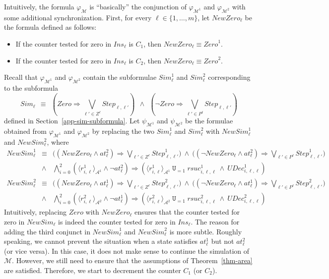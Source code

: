 \documentclass[a4paper,UKenglish,cleveref, autoref, thm-restate]{lipics-v2021}
\newcommand{\A}{\mathcal{A}}
\newcommand{\M}{\mathcal{M}}
\newcommand{\ex}[1]{\langle #1 \rangle}
\newcommand{\Simulate}{\mathit{Sim}}
\newcommand{\NewSimulate}{\mathit{NewSim}}
\newcommand{\Step}{\mathit{Step}}
\newcommand{\Zero}{\mathit{Zero}}
\newcommand{\NewZero}{\textit{NewZero}}
\newcommand{\Ins}{\mathit{Ins}}
\newcommand{\at}{\mathit{at}}
\newcommand{\rSuc}{\textit{rsuc}}
\newcommand{\UDec}{\textit{UDec}}
\newcommand*{\opu}{\operatorname{\pmb{\mathtt{U}}}}
\begin{document}
Intuitively, the formula $\varphi_\M$ is ``basically'' the conjunction of $\varphi_{\M^1}$ and $\varphi_{\M^2}$ with some additional synchronization. First, for every $\ell \in \{1,\ldots,m\}$, let $\NewZero_\ell$ be the formula defined as follows:
\begin{itemize}
    \item If the counter tested for zero in $\Ins_\ell$ is $C_1$, then $\NewZero_\ell \equiv \Zero^1$.
    \item If the counter tested for zero in $\Ins_\ell$ is $C_2$, then $\NewZero_\ell \equiv \Zero^2$.
\end{itemize}  
Recall that $\varphi_{\M^1}$ and $\varphi_{\M^2}$ contain the subformulae 
$\Simulate_\ell^1$ and $\Simulate_\ell^2$ corresponding to the subformula
\begin{equation*}\textstyle
    \Simulate_\ell ~~\equiv~~ (\Zero \Rightarrow \bigvee_{\ell' \in Z^\ell} \Step_{\ell,\ell'}) ~~\wedge~~
    (\neg\Zero \Rightarrow \bigvee_{\ell' \in P^\ell} \Step_{\ell,\ell'}) 
\end{equation*} 
defined in Section~\ref{app-sim-subformula}. Let $\psi_{\M^1}$ and $\psi_{\M^2}$ be the formulae obtained from $\varphi_{\M^1}$ and $\varphi_{\M^2}$ by replacing the 
two $\Simulate_\ell^1$ and $\Simulate_\ell^2$ with $\NewSimulate_\ell^1$ and $\NewSimulate_\ell^2$, where
{\small \begin{eqnarray*}
    \NewSimulate_\ell^1 & \equiv & \textstyle\big((\NewZero_\ell \wedge \at_{\ell}^2) \Rightarrow
       \bigvee_{\ell' \in Z^\ell} \Step^1_{\ell,\ell'}\big) ~\wedge~
    \big((\neg\NewZero_\ell \wedge \at_{\ell}^2) \Rightarrow \bigvee_{\ell' \in P^\ell} \Step^1_{\ell,\ell'}\big)\\
     & \wedge & 
    \bigwedge_{i=0}^2 \left(\ex{r_{i,\ell}^1}_{\A^1} \wedge \neg\at_\ell^2\right) \Rightarrow  \left( \ex{r_{i,\ell}^1}_{\A^1} \opu_{=1} \rSuc^1_{i,\ell,\ell} 
    \ \wedge\ \UDec^1_{i,\ell,\ell} \right)\\  
    \NewSimulate_\ell^2 & \equiv & \textstyle\big((\NewZero_\ell \wedge \at_{\ell}^1) \Rightarrow \bigvee_{\ell' \in Z^\ell} \Step^2_{\ell,\ell'}\big) 
    ~\wedge~
    \big((\neg\NewZero_\ell \wedge \at_{\ell}^1) \Rightarrow \bigvee_{\ell' \in P^\ell} \Step^2_{\ell,\ell'}\big)\\
  & \wedge & \bigwedge_{i=0}^2 \left(\ex{r_{i,\ell}^2}_{\A^2} \wedge \neg\at_\ell^1\right) \Rightarrow  \left( \ex{r_{i,\ell}^2}_{\A^2} \opu_{=1} \rSuc^2_{i,\ell,\ell} \ \wedge\ \UDec^2_{i,\ell,\ell} \right) 
\end{eqnarray*}}Intuitively, replacing $\Zero$ with $\NewZero_\ell$ ensures that the counter tested for zero in $\NewSimulate_\ell$ is indeed the counter tested for zero in $\Ins_\ell$.
The reason for adding the third conjunct in $\NewSimulate_\ell^1$ and $\NewSimulate_\ell^2$ is more subtle. Roughly speaking, we cannot prevent the situation when a state satisfies $\at_\ell^1$ but not $\at_\ell^2$ (or vice versa). In this case, it does not make sense to continue the simulation of $\M$. However, we still need to ensure that the assumptions of Theorem~\ref{thm-area} are satisfied. Therefore, we start to decrement the counter $C_1$ (or $C_2$).
\end{document}
